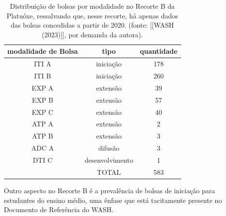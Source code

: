 \noindent\begin{center}\mbox{\centering{}}\end{center}






\begin{table}[htb]
\tiny
\caption{\label{ce6a9b067c8c0983df5f5cd1fd18c89955204b38}Distribuição de bolsas por modalidade no Recorte B da Platuóxe, ressalvando que, nesse recorte, há apenas dados das bolsas concedidas a partir de 2020. (fonte:  [[WASH (2023)]], por demanda da autora).}

\centering
\begin{tabular}{|c|c|c|}
\hline
modalidade de Bolsa  &  tipo  &  quantidade \\
\hline
ITI A  &  iniciação  &  178 \\
ITI B  &  iniciação  &  260 \\
EXP A  &  extensão  &  39 \\
EXP B  &  extensão  &  57 \\
EXP C  &  extensão  &  40 \\
ATP A  &  extensão  &  2 \\
ATP B  &  extensão  &  3 \\
ADC A  &  difusão  &  3 \\
DTI C  &  desenvolvimento  &  1 \\
\hline
  &  TOTAL  &  583 \\
\hline
\end{tabular}
\end{table}


Outro aspecto no Recorte B é a prevalência de bolsas de iniciação para estudantes do ensino médio, uma ênfase que está tacitamente presente no Documento de Referência do WASH.


\noindent\begin{center}\mbox{\centering{}}\end{center}


